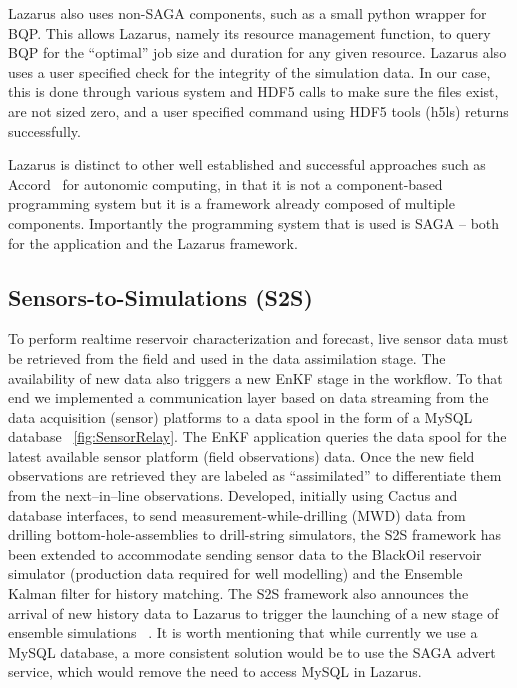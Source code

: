 \documentclass{rspublic}
\begin{document}
Lazarus also uses non-SAGA components, such as a small python wrapper
for BQP. This allows Lazarus, namely its resource management function,
to query BQP for the ``optimal'' job size and duration for any given
resource. Lazarus also uses a user specified check for the integrity
of the simulation data. In our case, this is done through various
system and HDF5 calls to make sure the files exist, are not sized
zero, and a user specified command using HDF5 tools (h5ls) returns
successfully.

Lazarus is distinct to other well established and successful
approaches such as Accord~\cite{accord} for autonomic computing, in
that it is not a component-based programming system but it is a
framework already composed of multiple components. Importantly the
programming system that is used is SAGA -- both for the application
and the Lazarus framework.


\subsection{Sensors-to-Simulations (S2S)} 

To perform realtime reservoir characterization and forecast, live
sensor data must be retrieved from the field and used in the data
assimilation stage. The availability of new data also triggers a new
EnKF stage in the workflow. To that end we implemented a communication
layer based on data streaming from the data acquisition (sensor)
platforms to a data spool in the form of a MySQL database
~\ref{fig:SensorRelay}. The EnKF application queries the data spool
for the latest available sensor platform (field observations)
data. Once the new field observations are retrieved they are labeled
as ``assimilated'' to differentiate them from the next--in--line
observations.  Developed, initially using Cactus and database
interfaces, to send measurement-while-drilling (MWD) data from
drilling bottom-hole-assemblies to drill-string simulators, the S2S
framework has been extended to accommodate sending sensor data to the
BlackOil reservoir simulator (production data required for well
modelling) and the Ensemble Kalman filter for history matching. The
S2S framework also announces the arrival of new history data to
Lazarus to trigger the launching of a new stage of ensemble
simulations ~\citep{Duff1,Duff2}.  It is worth mentioning that while
currently we use a MySQL database, a more consistent solution would be
to use the SAGA advert service, which would remove the need to access
MySQL in Lazarus.
\end{document}
